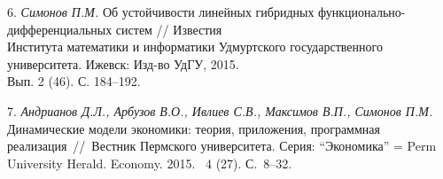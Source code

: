 6.
{\it Симонов П.М.} Об устойчивости линейных гибридных функционально-дифференциальных систем // Известия\\Института математики и информатики Удмуртского государственного университета. Ижевск: Изд-во УдГУ, 2015.\\Вып. 2 (46). С. 184--192.


7.
{\it Андрианов Д.Л., Арбузов В.О., Ивлиев С.В., Максимов В.П., Симонов П.М.} Динамические модели экономики: теория, приложения, программная реализация~//~Вестник Пермского университета. Серия: ``Экономика'' = Perm University Herald. Economy. 2015. \No~4 (27). С.~8--32.
